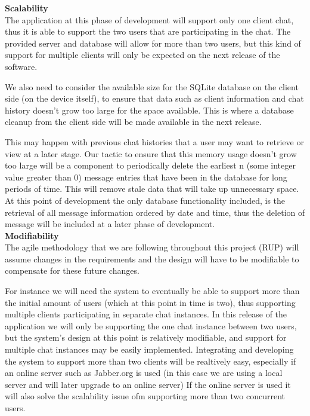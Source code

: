 \documentclass[29pt,a4paper]{moderncv}
\begin{document}
			\noindent\textbf{Scalability}\\
				The application at this phase of development will support only one client chat, thus it is able to support the two users that are participating in the chat. The provided server and database will allow for more than two users, but this kind of support for multiple clients will only be expected on the next release of the software. 
				
				We also need to consider the available size for the SQLite database on the client side (on the device itself), to ensure that data such as client information and chat history doesn’t grow too large for the space available. This is where a database cleanup from the client side will be made available in the next release.
				
				This may happen with previous chat histories that a user may want to retrieve or view at a later stage. Our tactic to ensure that this memory usage doesn’t grow too large will be a component to periodically delete the earliest n (some integer value greater than 0) message entries that have been in the database for long periods of time. This will remove stale data that will take up unnecessary space.  At this point of development the only database functionality included, is the retrieval of all message information ordered by date and time, thus the deletion of message will be included at a later phase of development.\\
			
			\noindent\textbf{Modifiability}\\
			The agile methodology that we are following throughout this project (RUP) will assume changes in the requirements and the design will have to be modifiable to compensate for these future changes.
			
			For instance we will need the system to eventually be able to support more than the initial amount of users (which at this point in time is two), thus supporting multiple clients participating in separate chat instances.  In this release of the application we will only be supporting the one chat instance between two users, but the system’s design at this point is relatively modifiable, and support for multiple chat instances may be easily implemented. Integrating and developing the system to support more than two clients will be realtively easy, especially if an online server such as Jabber.org is used (in this case we are using a local server and will later upgrade to an online server) If the online server is used it will also solve the scalability issue ofm supporting more than two concurrent users.
			
\end{document}
